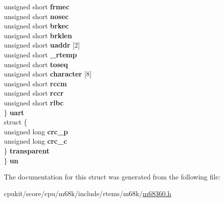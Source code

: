 \begin{DoxyCompactItemize}
\begin{tabbing}
\>\>unsigned short {\bfseries frmec}\\
\>\>unsigned short {\bfseries nosec}\\
\>\>unsigned short {\bfseries brkec}\\
\>\>unsigned short {\bfseries brklen}\\
\>\>unsigned short {\bfseries uaddr} \mbox{[}2\mbox{]}\\
\>\>unsigned short {\bfseries \_rtemp}\\
\>\>unsigned short {\bfseries toseq}\\
\>\>unsigned short {\bfseries character} \mbox{[}8\mbox{]}\\
\>\>unsigned short {\bfseries rccm}\\
\>\>unsigned short {\bfseries rccr}\\
\>\>unsigned short {\bfseries rlbc}\\
\>\} {\bfseries uart}\\
\>struct \{\\
\>\>unsigned long {\bfseries crc\_p}\\
\>\>unsigned long {\bfseries crc\_c}\\
\>\} {\bfseries transparent}\\
\} {\bfseries un}\\

\end{tabbing}\end{DoxyCompactItemize}


The documentation for this struct was generated from the following file\+:\begin{DoxyCompactItemize}
\item 
cpukit/score/cpu/m68k/include/rtems/m68k/\mbox{\hyperlink{m68360_8h}{m68360.\+h}}\end{DoxyCompactItemize}
